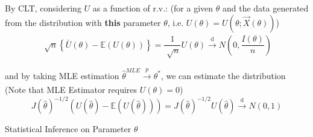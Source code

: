     By CLT, considering $ U $ as a function of r.v.: (for a given $ \theta  $ and the data generated from the distribution with \textbf{this} parameter $ \theta  $, i.e. $ U(\theta )=U\left(\theta ;\vec{X}(\theta )\right) $)
    \begin{align}
        \sqrt[]{n}\left\{ \bar{U}(\theta )-\mathbb{E}(U(\theta )) \right\} = \dfrac{1}{\sqrt[]{n}} U(\theta ) \xrightarrow[]{\mathrm{d}} N(0,\dfrac{I(\theta )}{n})
    \end{align}

    and by taking MLE estimation $ \hat{\theta }^{MLE}\xrightarrow[]{p} \theta ^* $, we can estimate the distribution (Note that MLE Estimator requires $ U(\theta )=0 $)
    \begin{equation}
        J(\hat{\theta })^{-1/2}\left(U(\hat{\theta })-\mathbb{E}(U(\hat{\theta } ))\right)=J(\hat{\theta })^{-1/2}U(\hat{\theta }) \xrightarrow[]{\mathrm{d}} N(0,1)
    \end{equation}
    

\begin{point}
    Statistical Inference on Parameter $ \theta  $
\end{point}

